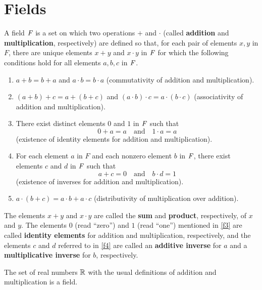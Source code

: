 \chapter{Fields}\label{ch:c}

\begin{defn}\label{c.0.1}
	A field \(\mathit{F}\) is a set on which two operations \(+\) and \(\cdot\) (called \textbf{addition} and \textbf{multiplication}, respectively) are defined so that, for each pair of elements \(x, y\) in \(F\), there are unique elements \(x + y\) and \(x \cdot y\) in \(\mathit{F}\) for which the following conditions hold for all elements \(a, b, c\) in \(\mathit{F}\).
	\begin{enumerate}[label=(F \arabic*), ref=F \arabic*]
		\item\label{f1} \(a + b = b + a\) and \(a \cdot b = b \cdot a\)
		(commutativity of addition and multiplication).
		\item\label{f2} \((a + b) + c = a + (b + c)\) and \((a \cdot b) \cdot c = a \cdot (b \cdot c)\)
		(associativity of addition and multiplication).
		\item\label{f3} There exist distinct elements \(0\) and \(1\) in \(\mathit{F}\) such that
		\[
			0 + a = a \quad \text{and} \quad 1 \cdot a = a
		\]
		(existence of identity elements for addition and multiplication).
		\item\label{f4} For each element \(a\) in \(F\) and each nonzero element \(b\) in \(\mathit{F}\), there exist elements \(c\) and \(d\) in \(\mathit{F}\) such that
		\[
			a + c = 0 \quad \text{and} \quad b \cdot d = 1
		\]
		(existence of inverses for addition and multiplication).
		\item\label{f5} \(a \cdot (b + c) = a \cdot b + a \cdot c\)
		(distributivity of multiplication over addition).
	\end{enumerate}
	The elements \(x + y\) and \(x \cdot y\) are called the \textbf{sum} and \textbf{product}, respectively, of \(x\) and \(y\).
	The elements \(0\) (read ``zero'') and \(1\) (read ``one'') mentioned in \ref{f3} are called \textbf{identity elements} for addition and multiplication, respectively, and the elements \(c\) and \(d\) referred to in \ref{f4} are called an \textbf{additive inverse} for \(a\) and a \textbf{multiplicative inverse} for \(b\), respectively.
\end{defn}

\begin{eg}\label{c.0.2}
	The set of real numbers \(\mathbb{R}\) with the usual definitions of addition and multiplication is a field.
\end{eg}

